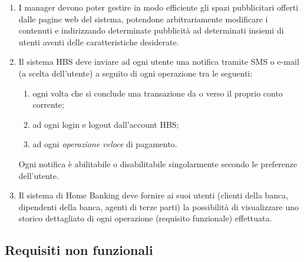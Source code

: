 \begin{enumerate}
\begin{enumerate}
			\item valutazione di rischio prodotta dal manager che ha creato il pacchetto;
			\item costo del pacchetto;
			\item valore garantito di vendita del pacchetto;
			\item percentuale di guadagno della banca alla vendita del pacchetto.
		\end{enumerate}
		I pacchetti di investimento vengono acquistati dai clienti della banca e formano un \emph{portafoglio di investimento}.
	\item I manager devono poter gestire in modo efficiente gli spazi pubblicitari offerti dalle pagine web del sistema, potendone arbitrariamente modificare i contenuti e indirizzando determinate pubblicità ad determinati insiemi di utenti aventi delle caratteristiche desiderate.
	\item Il sistema HBS deve inviare ad ogni utente una notifica tramite SMS o e-mail (a scelta dell'utente) a seguito di ogni operazione tra le seguenti:
		\begin{enumerate}
			\item ogni volta che si conclude una transazione da o verso il proprio conto corrente;
			\item ad ogni login e logout dall'account HBS;
			\item ad ogni \emph{operazione veloce} di pagamento.
		\end{enumerate}
	Ogni notifica \`e abilitabile o disabilitabile singolarmente secondo le preferenze dell'utente.
	\item Il sistema di Home Banking deve fornire ai suoi utenti (clienti della banca, dipendenti della banca, agenti di terze parti) la possibilit\`a di visualizzare uno storico dettagliato di ogni operazione (requisito funzionale) effettuata.
\end{enumerate}

\subsection{Requisiti non funzionali}

